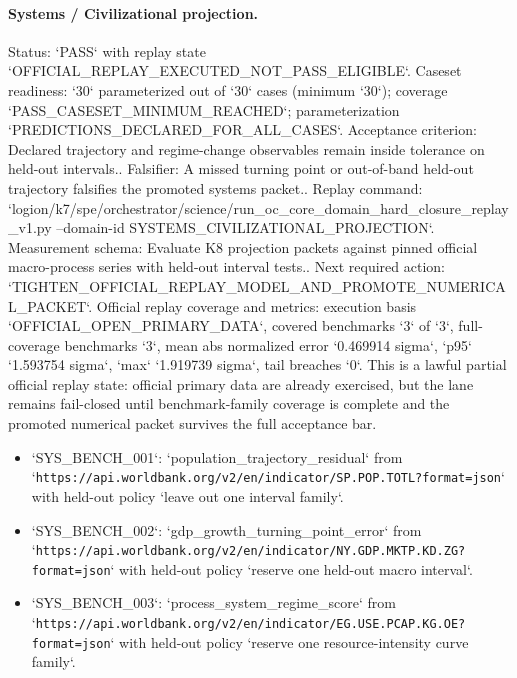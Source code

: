 \paragraph{Systems / Civilizational projection.}
Status: `PASS` with replay state `OFFICIAL\_REPLAY\_EXECUTED\_NOT\_PASS\_ELIGIBLE`.
Caseset readiness: `30` parameterized out of `30` cases (minimum `30`); coverage `PASS\_CASESET\_MINIMUM\_REACHED`; parameterization `PREDICTIONS\_DECLARED\_FOR\_ALL\_CASES`.
Acceptance criterion: Declared trajectory and regime-change observables remain inside tolerance on held-out intervals..
Falsifier: A missed turning point or out-of-band held-out trajectory falsifies the promoted systems packet..
Replay command: `logion/k7/spe/orchestrator/science/run\_oc\_core\_domain\_hard\_closure\_replay\_v1.py --domain-id SYSTEMS\_CIVILIZATIONAL\_PROJECTION`.
Measurement schema: Evaluate K8 projection packets against pinned official macro-process series with held-out interval tests..
Next required action: `TIGHTEN\_OFFICIAL\_REPLAY\_MODEL\_AND\_PROMOTE\_NUMERICAL\_PACKET`.
Official replay coverage and metrics: execution basis `OFFICIAL\_OPEN\_PRIMARY\_DATA`, covered benchmarks `3` of `3`, full-coverage benchmarks `3`, mean abs normalized error `0.469914 sigma`, `p95` `1.593754 sigma`, `max` `1.919739 sigma`, tail breaches `0`.
This is a lawful partial official replay state: official primary data are already exercised, but the lane remains fail-closed until benchmark-family coverage is complete and the promoted numerical packet survives the full acceptance bar.
\begin{itemize}
\item `SYS\_BENCH\_001`: `population\_trajectory\_residual` from `\texttt{https://api.worldbank.org/v2/en/indicator/SP.POP.TOTL?format=json}` with held-out policy `leave out one interval family`.
\item `SYS\_BENCH\_002`: `gdp\_growth\_turning\_point\_error` from `\texttt{https://api.worldbank.org/v2/en/indicator/NY.GDP.MKTP.KD.ZG?format=json}` with held-out policy `reserve one held-out macro interval`.
\item `SYS\_BENCH\_003`: `process\_system\_regime\_score` from `\texttt{https://api.worldbank.org/v2/en/indicator/EG.USE.PCAP.KG.OE?format=json}` with held-out policy `reserve one resource-intensity curve family`.
\end{itemize}
